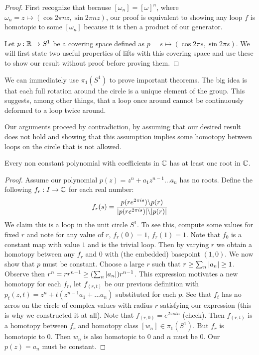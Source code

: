 \documentclass[10pt]{article}
\begin{document}
\begin{proof}

	First recognize that because $[\omega_n] = [\omega]^n$, where $\omega_n = z
	\mapsto (\cos 2\pi nz, \sin 2\pi nz)$, our proof is
	equivalent to showing any loop $f$ is homotopic to some $[\omega_n]$ because
	it is then a product of our generator.

	Let $p: \mathbb{R} \to S^1$ be a covering space defined as $p = s \mapsto (\cos 2\pi
	s, \sin 2\pi s)$. We will first state two useful properties of lifts with
	this covering space and use these to show our result without proof before
	proving them.

\end{proof}

We can immediately use $\pi_1(S^1)$ to prove important theorems. The big idea is that each full rotation around the circle is a unique element of the group. This suggests, among other things, that a loop once around cannot be continuously deformed to a loop twice around.

Our arguments proceed by contradiction, by assuming that our desired result does not hold and showing that this assumption implies some homotopy between loops on the circle that is not allowed.

\begin{theorem}
Every non constant polynomial with coefficients in $\mathbb{C}$ has at least one root in $\mathbb{C}$.
\end{theorem}

\begin{proof}
	Assume our polynomial $p(z) = z^n + a_1z^{n-1} ... a_n$ has no roots.
	Define the following $f_r: I \to \mathbb{C}$ for each real number:
	\[
		f_r(s) = \frac{p(re^{2\pi is}) \backslash p(r)}{\lvert p(re^{2\pi is})\rvert \backslash \lvert p(r)\rvert}
	\]
	We claim this is a loop in the unit circle $S^1$. To see this, compute some values for fixed $r$ and note for any value of $r$, $f_r(0) = 1$, $f_r(1) = 1$.
	Note that $f_0$ is a constant map with value $1$ and is the trivial loop. Then by varying $r$ we obtain a homotopy between any $f_r$ and $0$ with (the embedded) basepoint $(1, 0)$.
	\indent We now show that $p$ must be constant. Choose a large $r$ such that $r \geq \sum_n{\lvert a_n\rvert} \geq 1$. Observe then $r^n = rr^{n-1} \geq (\sum_n{\lvert a_n\rvert})r^{n-1}$.
	This expression motivates a new homotopy for each $f_r$, let $f_{(r, t)}$ be our previous definition with $p_t(z, t) = z^n + t(z^{n-1}a_1 + ... a_n)$ substituted for each $p$. See that $f_t$ has no zeros on the circle of complex values with radius $r$ satisfying our expression (this is why we constructed it at all).
	Note that $f_{(r, 0)} = e^{2\pi stn}$ (check). Then $f_{(r, t)}$ is a homotopy between $f_r$ and homotopy class $[w_n] \in \pi_1(S^1)$.  But $f_r$ is homotopic to $0$. Then $w_n$ is also homotopic to $0$ and $n$ must be 0. Our $p(z) = a_n$ must be constant.
\end{proof}
\end{document}
